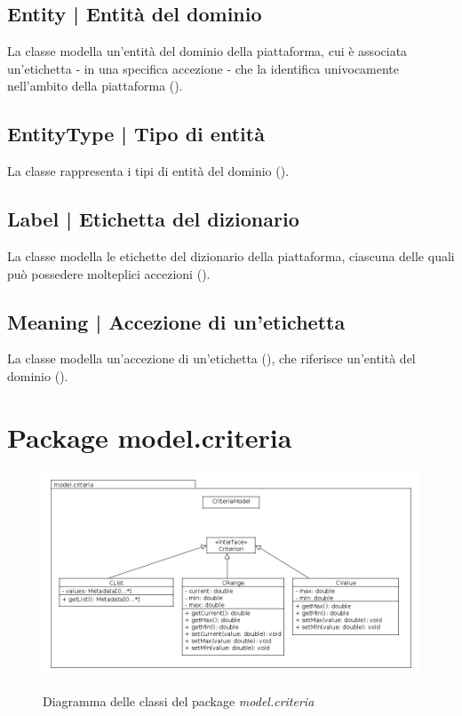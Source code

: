 \documentclass[10pt,a4paper,headinclude,footinclude,hidelinks]{scrreprt} %
\begin{document}
	\subsection[Entity]{Entity | Entità del dominio}
	\label{sec:stage:design:model:entity}
	La classe modella un'entità del dominio della piattaforma, cui è associata un'etichetta - in una specifica accezione - che la identifica univocamente nell'ambito della piattaforma (\textit{}).

	\subsection[EntityType]{EntityType | Tipo di entità}
	\label{sec:stage:design:model:entity-type}
	La classe rappresenta i tipi di entità del dominio (\textit{}).

	\subsection[Label]{Label | Etichetta del dizionario}
	\label{sec:stage:design:model:label}
	La classe modella le etichette del dizionario della piattaforma, ciascuna delle quali può possedere molteplici accezioni (\textit{}).

	\subsection[Meaning]{Meaning | Accezione di un'etichetta}
	\label{sec:stage:design:model:meaning}
	La classe modella un'accezione di un'etichetta (\textit{}), che riferisce un'entità del dominio (\textit{}).

	\section{Package model.criteria}
	\label{sec:stage:design:model.criteria}

	\begin{figure}[ht]
		\begin{center}
	    	\includegraphics[width=12cm]{class/model_criteria.png}
			\label{gfx:class:model:criteria}
			\caption{Diagramma delle classi del package \textit{model.criteria}}
		\end{center}
	\end{figure}
\end{document}
